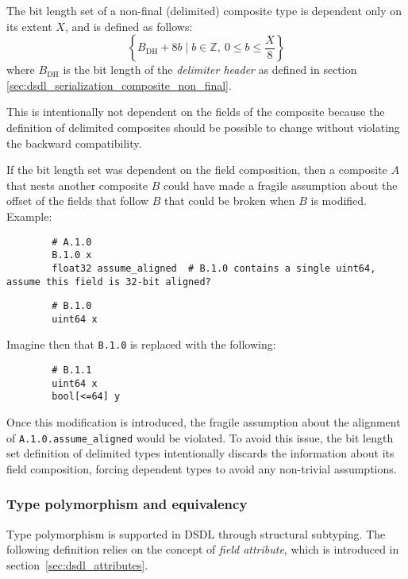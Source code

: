 The bit length set of a non-final (delimited) composite type is dependent only on its extent $X$,
and is defined as follows:
$$
    \left\{ B_\text{DH} + 8b \mid b \in \mathbb{Z},\ 0 \leq b \leq \frac{X}{8} \right\}
$$
where $B_\text{DH}$ is the bit length of the \emph{delimiter header}
as defined in section \ref{sec:dsdl_serialization_composite_non_final}.

\begin{remark}
    This is intentionally not dependent on the fields of the composite because the definition of delimited
    composites should be possible to change without violating the backward compatibility.

    If the bit length set was dependent on the field composition, then a composite $A$ that nests another composite
    $B$ could have made a fragile assumption about the offset of the fields that follow $B$
    that could be broken when $B$ is modified. Example:

    \begin{verbatim}
        # A.1.0
        B.1.0 x
        float32 assume_aligned  # B.1.0 contains a single uint64, assume this field is 32-bit aligned?
    \end{verbatim}

    \begin{verbatim}
        # B.1.0
        uint64 x
    \end{verbatim}

    Imagine then that \verb|B.1.0| is replaced with the following:

    \begin{verbatim}
        # B.1.1
        uint64 x
        bool[<=64] y
    \end{verbatim}

    Once this modification is introduced, the fragile assumption about the alignment of
    \verb|A.1.0.assume_aligned| would be violated.
    To avoid this issue, the bit length set definition of delimited types intentionally discards the information
    about its field composition, forcing dependent types to avoid any non-trivial assumptions.
\end{remark}

\subsubsection{Type polymorphism and equivalency}

Type polymorphism is supported in DSDL through structural subtyping.
The following definition relies on the concept of \emph{field attribute},
which is introduced in section~\ref{sec:dsdl_attributes}.


